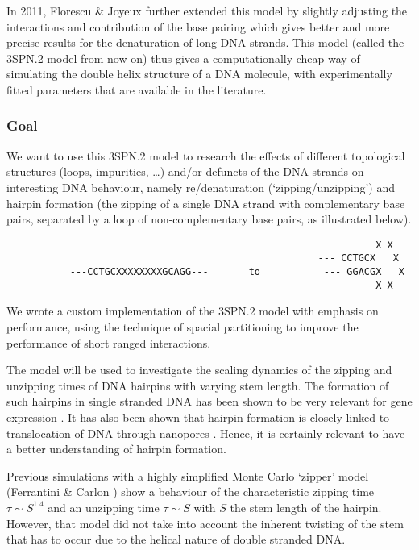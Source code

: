 In 2011, Florescu \& Joyeux \cite{florescu2011thermal} further extended this model by slightly adjusting the interactions and contribution of the base pairing which gives better and more precise results for the denaturation of long DNA strands. This model (called the 3SPN.2 model from now on) thus gives a computationally cheap way of simulating the double helix structure of a DNA molecule, with experimentally fitted parameters that are available in the literature.



\subsubsection*{Goal}

We want to use this 3SPN.2 model to research the effects of different topological structures (loops, impurities, \ldots) and/or defuncts of the DNA strands on interesting DNA behaviour, namely re/denaturation (`zipping/unzipping') and hairpin formation (the zipping of a single DNA strand with complementary base pairs, separated by a loop of non-complementary base pairs, as illustrated below).
\begin{verbatim}
                                                                X X
                                                      --- CCTGCX   X
           ---CCTGCXXXXXXXXGCAGG---	      to           --- GGACGX   X
                                                                X X
\end{verbatim}
We wrote a custom implementation of the 3SPN.2 model with emphasis on performance, using the technique of spacial partitioning \cite{plimpton1995fast} to improve the performance of short ranged interactions.

The model will be used to investigate the scaling dynamics of the zipping and unzipping times of DNA hairpins with varying stem length. The formation of such hairpins in single stranded DNA has been shown to be very relevant for gene expression \cite{oettinger2000hairpins}. It has also been shown that hairpin formation is closely linked to translocation of DNA through nanopores \cite{carlon2011anomalous}. Hence, it is certainly relevant to have a better understanding of hairpin formation.

Previous simulations with a highly simplified Monte Carlo `zipper' model (Ferrantini \& Carlon \cite{carlon2011anomalous}) show a behaviour of the characteristic zipping time $\tau \sim S^{1.4}$ and an unzipping time $\tau \sim S$ with $S$ the stem length of the hairpin. However, that model did not take into account the inherent twisting of the stem that has to occur due to the helical nature of double stranded DNA.

